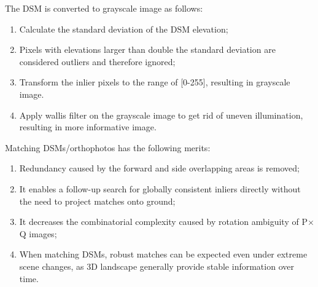 %

The DSM is converted to grayscale image as follows:\\
\begin{enumerate}
    \item Calculate the standard deviation of the DSM elevation;
    \item Pixels with elevations larger than double the standard deviation are considered outliers and therefore ignored;
    \item Transform the inlier pixels to the range of [0-255], resulting in grayscale image.
    \item Apply wallis filter on the grayscale image to get rid of uneven illumination, resulting in more informative image.
\end{enumerate}
\par
Matching DSMs/orthophotos has the following merits:
\begin{enumerate}
    \item Redundancy caused by the forward and side overlapping areas is removed;
    \item It enables a follow-up search for globally consistent inliers directly without the need to project matches onto ground;
    \item It decreases the combinatorial complexity caused by rotation ambiguity of P$\times$Q images;
    \item When matching DSMs, robust matches can be expected even under extreme scene changes, as 3D landscape generally provide stable information over time.
\end{enumerate}

